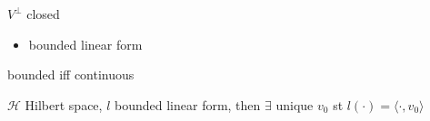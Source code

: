 \begin{fact}
    $V^\perp$ closed
\end{fact}

\begin{itemize}
    \item bounded linear form
\end{itemize}

\begin{fact}
    bounded iff continuous
\end{fact}

\begin{thm}
    $\mathcal{H}$ Hilbert space, $l$ bounded linear form, then $\exists$ unique $v_0$ st $l(\cdot) = \langle \cdot, v_0 \rangle$
\end{thm}

